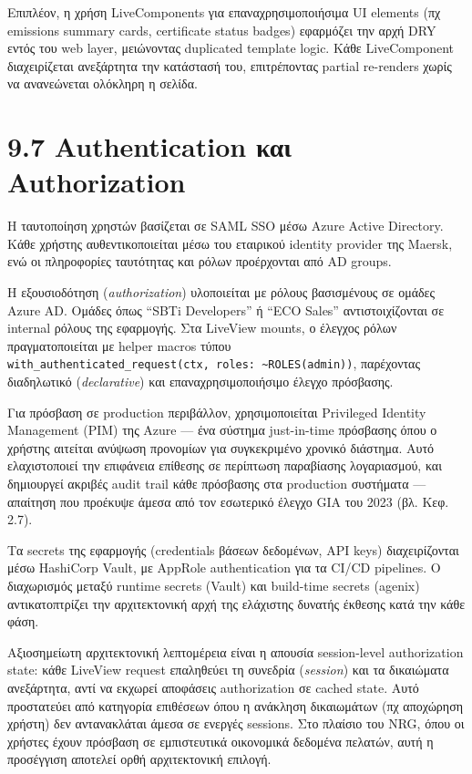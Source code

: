 Επιπλέον, η χρήση LiveComponents για επαναχρησιμοποιήσιμα UI elements
(πχ emissions summary cards, certificate status badges) εφαρμόζει την
αρχή DRY εντός του web layer, μειώνοντας duplicated template logic. Κάθε
LiveComponent διαχειρίζεται ανεξάρτητα την κατάστασή του, επιτρέποντας
partial re-renders χωρίς να ανανεώνεται ολόκληρη η σελίδα.

\section{9.7 Authentication και
Authorization}\label{authentication-ux3baux3b1ux3b9-authorization}

Η ταυτοποίηση χρηστών βασίζεται σε SAML SSO μέσω Azure Active Directory.
Κάθε χρήστης αυθεντικοποιείται μέσω του εταιρικού identity provider της
Maersk, ενώ οι πληροφορίες ταυτότητας και ρόλων προέρχονται από AD
groups.

Η εξουσιοδότηση (\emph{authorization}) υλοποιείται με ρόλους βασισμένους
σε ομάδες Azure AD. Ομάδες όπως ``SBTi Developers'' ή ``ECO Sales''
αντιστοιχίζονται σε internal ρόλους της εφαρμογής. Στα LiveView mounts,
ο έλεγχος ρόλων πραγματοποιείται με helper macros τύπου
\texttt{with\_authenticated\_request(ctx,\ roles:\ \textasciitilde{}ROLES(admin))},
παρέχοντας διαδηλωτικό (\emph{declarative}) και επαναχρησιμοποιήσιμο
έλεγχο πρόσβασης.

Για πρόσβαση σε production περιβάλλον, χρησιμοποιείται Privileged
Identity Management (PIM) της Azure --- ένα σύστημα just-in-time
πρόσβασης όπου ο χρήστης αιτείται ανύψωση προνομίων για συγκεκριμένο
χρονικό διάστημα. Αυτό ελαχιστοποιεί την επιφάνεια επίθεσης σε περίπτωση
παραβίασης λογαριασμού, και δημιουργεί ακριβές audit trail κάθε
πρόσβασης στα production συστήματα --- απαίτηση που προέκυψε άμεσα από
τον εσωτερικό έλεγχο GIA του 2023 (βλ. Κεφ. 2.7).

Τα secrets της εφαρμογής (credentials βάσεων δεδομένων, API keys)
διαχειρίζονται μέσω HashiCorp Vault, με AppRole authentication για τα
CI/CD pipelines. Ο διαχωρισμός μεταξύ runtime secrets (Vault) και
build-time secrets (agenix) αντικατοπτρίζει την αρχιτεκτονική αρχή της
ελάχιστης δυνατής έκθεσης κατά την κάθε φάση.

Αξιοσημείωτη αρχιτεκτονική λεπτομέρεια είναι η απουσία session-level
authorization state: κάθε LiveView request επαληθεύει τη συνεδρία
(\emph{session}) και τα δικαιώματα ανεξάρτητα, αντί να εκχωρεί αποφάσεις
authorization σε cached state. Αυτό προστατεύει από κατηγορία επιθέσεων
όπου η ανάκληση δικαιωμάτων (πχ αποχώρηση χρήστη) δεν αντανακλάται άμεσα
σε ενεργές sessions. Στο πλαίσιο του NRG, όπου οι χρήστες έχουν πρόσβαση
σε εμπιστευτικά οικονομικά δεδομένα πελατών, αυτή η προσέγγιση αποτελεί
ορθή αρχιτεκτονική επιλογή.

